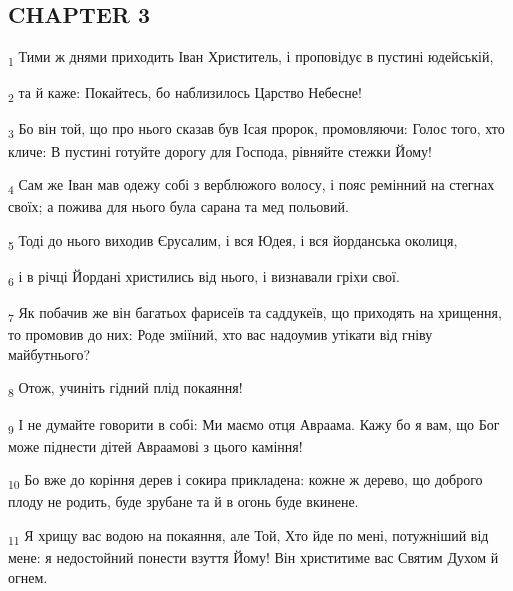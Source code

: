 \subsection{CHAPTER 3}
\begin{tcolorbox}
\textsubscript{1} Тими ж днями приходить Іван Христитель, і проповідує в пустині юдейській,
\end{tcolorbox}
\begin{tcolorbox}
\textsubscript{2} та й каже: Покайтесь, бо наблизилось Царство Небесне!
\end{tcolorbox}
\begin{tcolorbox}
\textsubscript{3} Бо він той, що про нього сказав був Ісая пророк, промовляючи: Голос того, хто кличе: В пустині готуйте дорогу для Господа, рівняйте стежки Йому!
\end{tcolorbox}
\begin{tcolorbox}
\textsubscript{4} Сам же Іван мав одежу собі з верблюжого волосу, і пояс ремінний на стегнах своїх; а пожива для нього була сарана та мед польовий.
\end{tcolorbox}
\begin{tcolorbox}
\textsubscript{5} Тоді до нього виходив Єрусалим, і вся Юдея, і вся йорданська околиця,
\end{tcolorbox}
\begin{tcolorbox}
\textsubscript{6} і в річці Йордані христились від нього, і визнавали гріхи свої.
\end{tcolorbox}
\begin{tcolorbox}
\textsubscript{7} Як побачив же він багатьох фарисеїв та саддукеїв, що приходять на хрищення, то промовив до них: Роде зміїний, хто вас надоумив утікати від гніву майбутнього?
\end{tcolorbox}
\begin{tcolorbox}
\textsubscript{8} Отож, учиніть гідний плід покаяння!
\end{tcolorbox}
\begin{tcolorbox}
\textsubscript{9} І не думайте говорити в собі: Ми маємо отця Авраама. Кажу бо я вам, що Бог може піднести дітей Авраамові з цього каміння!
\end{tcolorbox}
\begin{tcolorbox}
\textsubscript{10} Бо вже до коріння дерев і сокира прикладена: кожне ж дерево, що доброго плоду не родить, буде зрубане та й в огонь буде вкинене.
\end{tcolorbox}
\begin{tcolorbox}
\textsubscript{11} Я хрищу вас водою на покаяння, але Той, Хто йде по мені, потужніший від мене: я недостойний понести взуття Йому! Він христитиме вас Святим Духом й огнем.
\end{tcolorbox}
